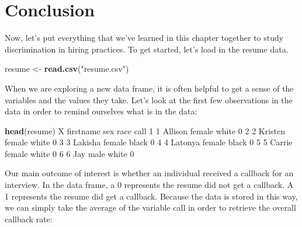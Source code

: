 \documentclass[
]{book}
\newenvironment{Shaded}{\begin{snugshade}}{\end{snugshade}}
\newcommand{\DecValTok}[1]{\textcolor[rgb]{0.00,0.00,0.81}{#1}}
\newcommand{\FunctionTok}[1]{\textcolor[rgb]{0.13,0.29,0.53}{\textbf{#1}}}
\newcommand{\NormalTok}[1]{#1}
\newcommand{\OtherTok}[1]{\textcolor[rgb]{0.56,0.35,0.01}{#1}}
\newcommand{\SpecialCharTok}[1]{\textcolor[rgb]{0.81,0.36,0.00}{\textbf{#1}}}
\newcommand{\StringTok}[1]{\textcolor[rgb]{0.31,0.60,0.02}{#1}}
\begin{document}
\begin{Shaded}
\end{Shaded}

\section{Conclusion}\label{conclusion-4}

Now, let's put everything that we've learned in this chapter together to study discrimination in hiring practices. To get started, let's load in the resume data.

\begin{Shaded}
\begin{Highlighting}[]
\NormalTok{resume }\OtherTok{\textless{}{-}} \FunctionTok{read.csv}\NormalTok{(}\StringTok{"resume.csv"}\NormalTok{)}
\end{Highlighting}
\end{Shaded}

When we are exploring a new data frame, it is often helpful to get a sense of the variables and the values they take. Let's look at the first few observations in the data in order to remind ourselves what is in the data:

\begin{Shaded}
\begin{Highlighting}[]
\FunctionTok{head}\NormalTok{(resume)}
\NormalTok{  X firstname    sex  race call}
\DecValTok{1} \DecValTok{1}\NormalTok{   Allison female white    }\DecValTok{0}
\DecValTok{2} \DecValTok{2}\NormalTok{   Kristen female white    }\DecValTok{0}
\DecValTok{3} \DecValTok{3}\NormalTok{   Lakisha female black    }\DecValTok{0}
\DecValTok{4} \DecValTok{4}\NormalTok{   Latonya female black    }\DecValTok{0}
\DecValTok{5} \DecValTok{5}\NormalTok{    Carrie female white    }\DecValTok{0}
\DecValTok{6} \DecValTok{6}\NormalTok{       Jay   male white    }\DecValTok{0}
\end{Highlighting}
\end{Shaded}

Our main outcome of interest is whether an individual received a callback for an interview. In the data frame, a 0 represents the resume did not get a callback. A 1 represents the resume did get a callback. Because the data is stored in this way, we can simply take the average of the variable call in order to retrieve the overall callback rate:
\end{document}
